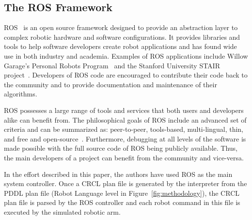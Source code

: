 







\subsection{The ROS Framework}
ROS~\cite{ROSWeb} is an open source framework designed to provide an abstraction layer to complex robotic hardware and software configurations. It provides libraries and tools to help software developers create robot applications and has found wide use in both industry and academia. Examples of ROS applications include
Willow Garage's Personal Robots Program~\cite{WYOBEK.ICRA.2008} and the Stanford University STAIR project~\cite{QUIGLEY.AAAI.2007}. Developers of ROS code are encouraged to
contribute their code back to the community and to provide documentation and maintenance of their algorithms.

ROS possesses a large range of tools and services that both users and developers alike can benefit from. The philosophical goals of ROS include an advanced set of criteria and can be summarized as: peer-to-peer, tools-based, multi-lingual, thin, and free and open-source~\cite{QUIGLEY.ICRA.2009}. Furthermore, debugging at all levels of the software is made possible with the full source code of ROS being publicly available. Thus, the main developers of a project can benefit from the community and vice-versa.

In the effort described in this paper, the authors have used ROS as the main system controller. Once a CRCL plan file is generated by the interpreter from the PDDL plan file (Robot Language level in Figure~\ref{fig:methodology}), the CRCL plan file is parsed by the ROS controller and each robot command in this file is executed by the simulated robotic arm.

